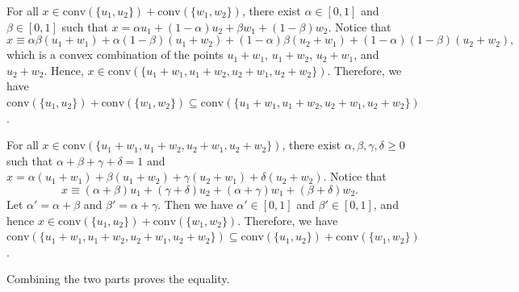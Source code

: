\documentclass[12pt,a4paper]{article}
\begin{document}
\begin{problem}
    For all $x \in \text{conv}(\{u_1,u_2\}) + \text{conv}(\{w_1,w_2\})$, there exist $\alpha \in [0,1]$ and $\beta \in [0,1]$ such that $x = \alpha u_1 + (1-\alpha) u_2 + \beta w_1 + (1-\beta) w_2$. Notice that
    \[
    x \equiv \alpha\beta (u_1 + w_1) + \alpha(1-\beta)(u_1 + w_2) + (1-\alpha)\beta(u_2 + w_1) + (1-\alpha)(1-\beta)(u_2 + w_2),
    \]
    which is a convex combination of the points $u_1 + w_1$, $u_1 + w_2$, $u_2 + w_1$, and $u_2 + w_2$. Hence, $x \in \text{conv}(\{u_1+w_1,u_1+w_2,u_2+w_1,u_2+w_2\})$. Therefore, we have $\text{conv}(\{u_1,u_2\}) + \text{conv}(\{w_1,w_2\}) \subseteq \text{conv}(\{u_1+w_1,u_1+w_2,u_2+w_1,u_2+w_2\})$.

    For all $x \in \text{conv}(\{u_1+w_1,u_1+w_2,u_2+w_1,u_2+w_2\})$, there exist $\alpha, \beta, \gamma, \delta \ge 0$ such that $\alpha + \beta + \gamma + \delta = 1$ and \(x = \alpha (u_1 + w_1) + \beta (u_1 + w_2) + \gamma (u_2 + w_1) + \delta (u_2 + w_2)\). Notice that
    \[
    x \equiv (\alpha + \beta) u_1 + (\gamma + \delta) u_2 + (\alpha + \gamma) w_1 + (\beta + \delta) w_2.
    \]
    Let $\alpha' = \alpha + \beta$ and $\beta' = \alpha + \gamma$. Then we have $\alpha' \in [0,1]$ and $\beta' \in [0,1]$, and hence $x \in \text{conv}(\{u_1,u_2\}) + \text{conv}(\{w_1,w_2\})$. Therefore, we have $\text{conv}(\{u_1+w_1,u_1+w_2,u_2+w_1,u_2+w_2\}) \subseteq \text{conv}(\{u_1,u_2\}) + \text{conv}(\{w_1,w_2\})$.

    Combining the two parts proves the equality.
\end{problem}
\end{document}
